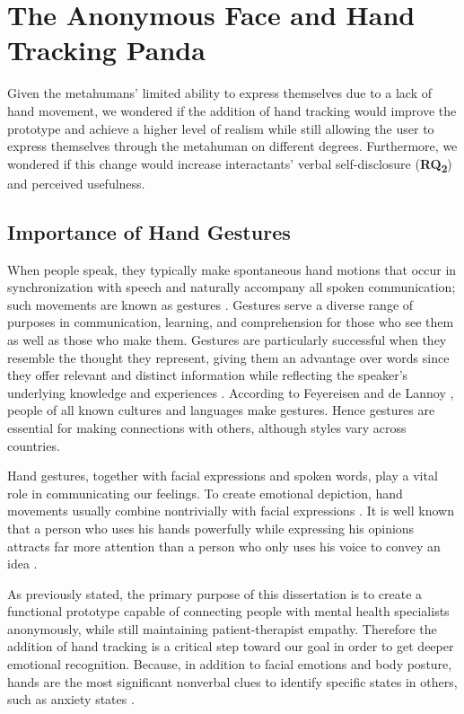 \section{The Anonymous Face and Hand Tracking Panda}
Given the metahumans' limited ability to express themselves due to a lack of hand movement, we wondered if the addition of hand tracking would improve the prototype and achieve a higher level of realism while still allowing the user to express themselves through the metahuman on different degrees. Furthermore, we wondered if this change would increase interactants' verbal self-disclosure (\textbf{RQ\textsubscript{2}}) and perceived usefulness.

\subsection{Importance of Hand Gestures}
When people speak, they typically make spontaneous hand motions that occur in synchronization with speech and naturally accompany all spoken communication; such movements are known as gestures \cite{CLO20}. Gestures serve a diverse range of purposes in communication, learning, and comprehension for those who see them as well as those who make them. Gestures are particularly successful when they resemble the thought they represent, giving them an advantage over words since they offer relevant and distinct information while reflecting the speaker's underlying knowledge and experiences \cite{CLO20, KAN16B}. According to Feyereisen and de Lannoy \cite{FEY91}, people of all known cultures and languages make gestures. Hence gestures are essential for making connections with others, although styles vary across countries.

Hand gestures, together with facial expressions and spoken words, play a vital role in communicating our feelings. To create emotional depiction, hand movements usually combine nontrivially with facial expressions \cite{ARJ20}. It is well known that a person who uses his hands powerfully while expressing his opinions attracts far more attention than a person who only uses his voice to convey an idea \cite{COO10, WAK18}.

As previously stated, the primary purpose of this dissertation is to create a functional prototype capable of connecting people with mental health specialists anonymously, while still maintaining patient-therapist empathy. Therefore the addition of hand tracking is a critical step toward our goal in order to get deeper emotional recognition. Because, in addition to facial emotions and body posture, hands are the most significant nonverbal clues to identify specific states in others, such as anxiety states \cite{WAX97, REI22}. 


